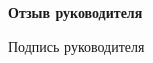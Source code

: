 \begin{center}
	\large\textbf{Отзыв руководителя}\\
\end{center}

\begin{flushright}
	Подпись руководителя \underline{\hspace{3cm}}
\end{flushright}
\newpage